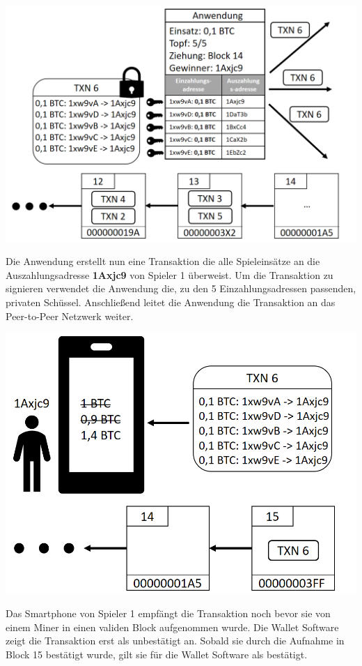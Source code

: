 \vspace{1cm}
\begin{minipage}{0.55\textwidth}
\includegraphics[width=\textwidth]{Figures/konzept_btc/konzept11}
\centering
\decoRule
{}
\label{fig:konzept11}
\end{minipage}
\begin{minipage}{0.45\textwidth}
Die Anwendung erstellt nun eine Transaktion die alle Spieleinsätze an die Auszahlungsadresse \textbf{1Axjc9} von Spieler 1 überweist. Um die Transaktion zu signieren verwendet die Anwendung die, zu den 5 Einzahlungsadressen passenden, privaten Schüssel. Anschließend leitet die Anwendung die Transaktion an das Peer-to-Peer Netzwerk weiter.
\end{minipage}

\vspace{1cm}
\begin{minipage}{0.55\textwidth}
\includegraphics[width=\textwidth]{Figures/konzept_btc/konzept12}
\centering
\decoRule
{}
\label{fig:konzept12}
\end{minipage}
\begin{minipage}{0.45\textwidth}
Das Smartphone von Spieler 1 empfängt die Transaktion noch bevor sie von einem Miner in einen validen Block aufgenommen wurde. Die Wallet Software zeigt die Transaktion erst als unbestätigt an. Sobald sie durch die Aufnahme in Block 15 bestätigt wurde, gilt sie für die Wallet Software als bestätigt.
\end{minipage}